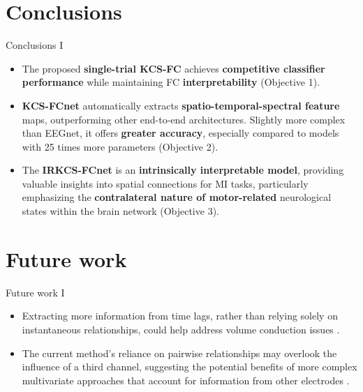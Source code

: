 \documentclass[aspectratio=169]{beamer}
\let\oldcite\cite %
\renewcommand{\cite}[1]{{\tiny\oldcite{#1}}}
\begin{document}
\section{Conclusions}
\begin{frame}{Conclusions I}
    \begin{itemize}
        \item The proposed \textbf{single-trial KCS-FC} achieves \textbf{competitive classifier performance} while maintaining FC \textbf{interpretability} (Objective 1).
        \vspace{1em}
        \item \textbf{KCS-FCnet} automatically extracts \textbf{spatio-temporal-spectral feature} maps, outperforming other end-to-end architectures. Slightly more complex than EEGnet, it offers \textbf{greater accuracy}, especially compared to models with 25 times more parameters (Objective 2).
        \vspace{1em}
        \item The \textbf{IRKCS-FCnet} is an \textbf{intrinsically interpretable model}, providing valuable insights into spatial connections for MI tasks, particularly emphasizing the \textbf{contralateral nature of motor-related} neurological states within the brain network (Objective 3).
        
    \end{itemize}
\end{frame}


\section{Future work}
\begin{frame}{Future work I}
    \begin{itemize}
        \item Extracting more information from time lags, rather than relying solely on instantaneous relationships, could help address volume conduction issues \cite{uribe2019correntropy, bakhshali2020eeg, de2019data}.
        \vspace{2em}
        \item The current method's reliance on pairwise relationships may overlook the influence of a third channel, suggesting the potential benefits of more complex multivariate approaches that account for information from other electrodes \cite{vidaurre2023novel}.
    \end{itemize}
\end{frame}
\end{document}
